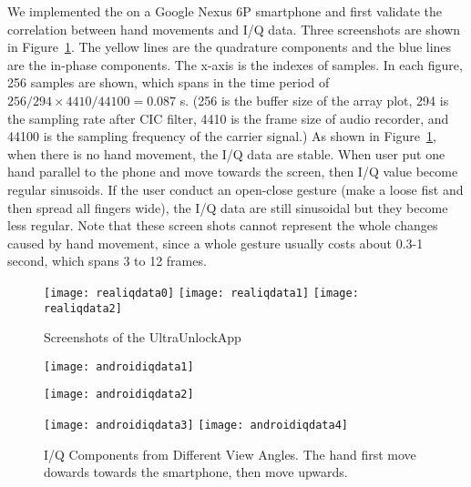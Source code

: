 We implemented the {\uu} on a Google Nexus 6P smartphone and first validate the correlation between hand movements and I/Q data.
Three screenshots are shown in Figure~\ref{fig:realIQ}. The yellow lines are the quadrature components and the blue lines are the in-phase components. The x-axis is the indexes of samples. In each figure, 256 samples are shown, which spans in the time period of $256/294\times4410/44100 = 0.087$ s. (256 is the buffer size of the array plot, 294 is the sampling rate after CIC filter, 4410 is the frame size of audio recorder, and 44100 is the sampling frequency of the carrier signal.) As shown in Figure~\ref{fig:realIQ}, when there is no hand movement, the I/Q data are stable. When user put one hand parallel to the phone and move towards the screen, then I/Q value become regular sinusoids. If the user conduct an open-close gesture (make a loose fist and then spread all fingers wide), the I/Q data are still sinusoidal but they become less regular. Note that these screen shots cannot represent the whole changes caused by hand movement, since a whole gesture usually costs about 0.3-1 second, which spans 3 to 12 frames.


\begin{figure}[h]
	\centering
	\begin{minipage}{.6\linewidth}
		\texttt{[image: realiqdata0]}
		\vspace{.1in}
		\texttt{[image: realiqdata1]}
		\vspace{.1in}
		\texttt{[image: realiqdata2]}
	\end{minipage}
	\caption{Screenshots of the UltraUnlockApp}	
	\label{fig:realIQ}
\end{figure}

\begin{figure}[!h]
	\centering
	\texttt{[image: androidiqdata1]}
	\begin{minipage}{.4\linewidth}
		\texttt{[image: androidiqdata2]}
	\end{minipage}
	\hfil
	\begin{minipage}{.5\linewidth}
		\texttt{[image: androidiqdata3]}
		\texttt{[image: androidiqdata4]}
	\end{minipage}
	\caption[I/Q Components Collected by UltraUnlockApp]{I/Q Components from Different View Angles. The hand first move dowards towards the smartphone, then move upwards.}
	\label{fig:androidiqdata}
\end{figure}

